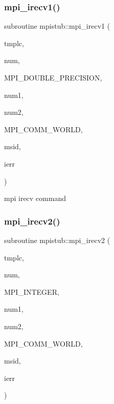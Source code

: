 \subsubsection{\texorpdfstring{mpi\_irecv1()}{mpi\_irecv1()}}
{\footnotesize\ttfamily subroutine mpistub\+::mpi\+\_\+irecv1 (\begin{DoxyParamCaption}\item[{double precision}]{tmplc,  }\item[{}]{num,  }\item[{}]{M\+P\+I\+\_\+\+D\+O\+U\+B\+L\+E\+\_\+\+P\+R\+E\+C\+I\+S\+I\+ON,  }\item[{}]{num1,  }\item[{}]{num2,  }\item[{}]{M\+P\+I\+\_\+\+C\+O\+M\+M\+\_\+\+W\+O\+R\+LD,  }\item[{}]{msid,  }\item[{}]{ierr }\end{DoxyParamCaption})}



mpi irecv command 

\mbox{\label{namespacempistub_a3f6d6a1e356cf0bed0327c5b9df47498}} 
\subsubsection{\texorpdfstring{mpi\_irecv2()}{mpi\_irecv2()}}
{\footnotesize\ttfamily subroutine mpistub\+::mpi\+\_\+irecv2 (\begin{DoxyParamCaption}\item[{integer}]{tmplc,  }\item[{}]{num,  }\item[{}]{M\+P\+I\+\_\+\+I\+N\+T\+E\+G\+ER,  }\item[{}]{num1,  }\item[{}]{num2,  }\item[{}]{M\+P\+I\+\_\+\+C\+O\+M\+M\+\_\+\+W\+O\+R\+LD,  }\item[{}]{msid,  }\item[{}]{ierr }\end{DoxyParamCaption})}

\mbox{\label{namespacempistub_ad39ca4d74dbf2a6bc63895fa2503e945}} 
